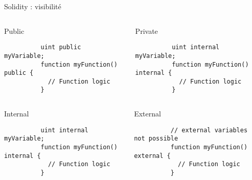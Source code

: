 \begin{frame}[fragile]{Solidity : visibilité}
  \begin{columns}
    \begin{column}{0.47\textwidth}
      \begin{block}{Public}
        \begin{verbatim}
          uint public myVariable;
          function myFunction() public {
            // Function logic
          }
        \end{verbatim}
      \end{block}
    \end{column}
    \vspace{0.03\textwidth}
    \begin{column}{0.47\textwidth}
      \begin{block}{Private}
        \begin{verbatim}
          uint internal myVariable;
          function myFunction() internal {
            // Function logic
          }
        \end{verbatim}
      \end{block}
    \end{column}
  \end{columns}

  \begin{columns}
    \begin{column}{0.47\textwidth}
      \begin{block}{Internal}
        \begin{verbatim}
          uint internal myVariable;
          function myFunction() internal {
            // Function logic
          }
        \end{verbatim}
      \end{block}
    \end{column}
    \vspace{0.03\textwidth}
    \begin{column}{0.47\textwidth}
      \begin{block}{External}
        \begin{verbatim}
          // external variables not possible 
          function myFunction() external {
            // Function logic
          }
        \end{verbatim}
      \end{block}
    \end{column}
  \end{columns}
\end{frame}

